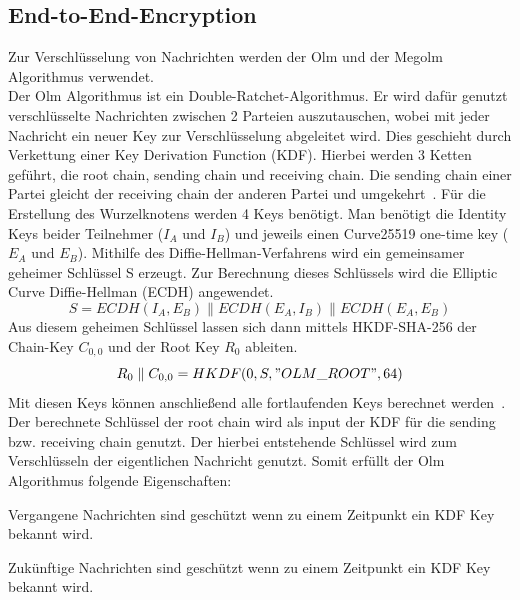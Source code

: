     \subsection{End-to-End-Encryption}\label{subsec:verwendete-schlussel}
    Zur Verschlüsselung von Nachrichten werden der Olm und der Megolm Algorithmus verwendet.\\
    Der Olm Algorithmus ist ein Double-Ratchet-Algorithmus.
    Er wird dafür genutzt verschlüsselte Nachrichten zwischen 2 Parteien auszutauschen, wobei mit jeder Nachricht ein neuer Key zur Verschlüsselung abgeleitet wird.
    Dies geschieht durch Verkettung einer Key Derivation Function (KDF).
    Hierbei werden 3 Ketten geführt, die root chain, sending chain und receiving chain.
    Die sending chain einer Partei gleicht der receiving chain der anderen Partei und umgekehrt~\cite{perrin2016double}.
    Für die Erstellung des Wurzelknotens werden 4 Keys benötigt.
    Man benötigt die Identity Keys beider Teilnehmer ($I_A$ und $I_B$) und jeweils einen Curve25519 one-time key ($E_A$ und $E_B$).
    Mithilfe des Diffie-Hellman-Verfahrens wird ein gemeinsamer geheimer Schlüssel S erzeugt.
    Zur Berechnung dieses Schlüssels wird die Elliptic Curve Diffie-Hellman (ECDH) angewendet.
    \begin{displaymath}
        S = ECDH(I_A,E_B)\parallel ECDH(E_A,I_B) \parallel ECDH(E_A,E_B)
    \end{displaymath}
    Aus diesem geheimen Schlüssel lassen sich dann mittels HKDF-SHA-256 der Chain-Key $C_{0,0}$ und der Root Key $R_0$ ableiten.
    \begin{displaymath}
        R_0 \parallel C_{0,0} = HKDF(0,S,"OLM\_ROOT",64)
    \end{displaymath}
    Mit diesen Keys können anschließend alle fortlaufenden Keys berechnet werden~\cite{olm}.
    Der berechnete Schlüssel der root chain wird als input der KDF für die sending bzw. receiving chain genutzt.
    Der hierbei entstehende Schlüssel wird zum Verschlüsseln der eigentlichen Nachricht genutzt.
    Somit erfüllt der Olm Algorithmus folgende Eigenschaften:
    \begin{description}[leftmargin=!,labelwidth=3cm]
        \item [Resilience]
        \item [Forward security] Vergangene Nachrichten sind geschützt wenn zu einem Zeitpunkt ein KDF Key bekannt wird.
        \item [Break-in recovery] Zukünftige Nachrichten sind geschützt wenn zu einem Zeitpunkt ein KDF Key bekannt wird.
    \end{description}

